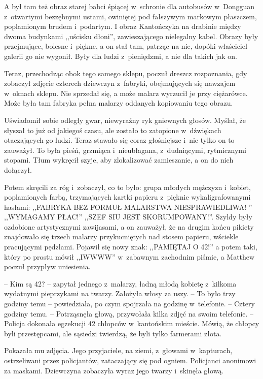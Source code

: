 \documentclass[oneside,polish,11pt,rmheadings]{mwbk}
\begin{document}
A był tam też obraz starej babci śpiącej w~schronie dla autobusów w~Dongguan z~otwartymi bezzębnymi ustami, owiniętej pod fałszywym markowym płaszczem, poplamionym brudem i~podartym. I obraz Kantończyka na drabinie między dwoma budynkami ,,uścisku dłoni'', zawieszającego nielegalny kabel. Obrazy były przejmujące, bolesne i~piękne, a on stał tam, patrząc na nie, dopóki właściciel galerii go nie wygonił. Były dla ludzi z~pieniędzmi, a nie dla takich jak on.

Teraz, przechodząc obok tego samego sklepu, poczuł dreszcz rozpoznania, gdy zobaczył zdjęcie czterech dziewczyn z~fabryki, obejmujących się nawzajem w~oknach sklepu. Nie sprzedał się, a może malarz wyrzucił je przy ciężarówce. Może była tam fabryka pełna malarzy oddanych kopiowaniu tego obrazu.

Uświadomił sobie odległy gwar, niewyraźny ryk gniewnych głosów. Myślał, że słyszał to już od jakiegoś czasu, ale zostało to zatopione w~dźwiękach otaczających go ludzi. Teraz stawało się coraz głośniejsze i~nie tylko on to zauważył. To była pieśń, grzmiąca i~nieubłagana, z~dudniącymi, rytmicznymi stopami. Tłum wykręcił szyje, aby zlokalizować zamieszanie, a on do nich dołączył.

Potem skręcili za róg i~zobaczył, co to było: grupa młodych mężczyzn i~kobiet, poplamionych farbą, trzymających kartki papieru z~pięknie wykaligrafowanymi hasłami: ,,FABRYKA BEZ FORMUŁ MALARSTWA NIESPRAWIEDLIWA! '' ,,WYMAGAMY PŁAC!'' ,,SZEF SIU JEST SKORUMPOWANY!''. Szyldy były ozdobione artystycznymi zawijasami, a on zauważył, że na drugim końcu pikiety znajdowało się trzech malarzy przykucniętych nad stosem papieru, wściekle pracującymi pędzlami. Pojawił się nowy znak: ,,PAMIĘTAJ O 42!'' a potem taki, który po prostu mówił ,,IWWWW'' w~zabawnym zachodnim piśmie, a Matthew poczuł przypływ uniesienia.

-- Kim są 42? -- zapytał jednego z~malarzy, ładną młodą kobietę z~kilkoma wydatnymi pieprzykami na twarzy. Założyła włosy za uszy. -- To było trzy godziny temu -- powiedziała, po czym spojrzała na godzinę w~telefonie. -- Cztery godziny temu. -- Potrząsnęła głową, przywołała kilka zdjęć na swoim telefonie. -- Policja dokonała egzekucji 42 chłopców w~kantońskim mieście. Mówią, że chłopcy byli przestępcami, ale sąsiedzi twierdzą, że byli tylko farmerami złota. 

Pokazała mu zdjęcia. Jego przyjaciele, na ziemi, z~głowami w~kapturach, ostrzeliwani przez policjantów, zataczający się pod ogniem. Policjanci anonimowi za maskami. Dziewczyna zobaczyła wyraz jego twarzy i~skinęła głową. 
\end{document}
